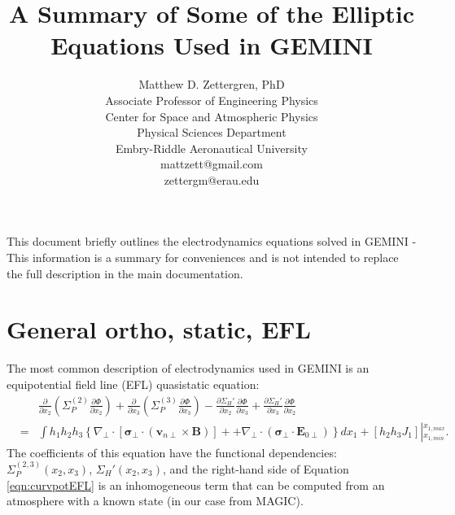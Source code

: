 \documentclass[11pt,letterpaper]{article}
\begin{document}
\setlength{\parindent}{0mm}
\setlength{\parskip}{0.4cm}




\title{A Summary of Some of the Elliptic Equations Used in GEMINI}
\author{Matthew D. Zettergren, PhD\\ Associate Professor of Engineering Physics\\ Center for Space and Atmospheric Physics\\ Physical Sciences Department \\Embry-Riddle Aeronautical University\\mattzett@gmail.com\\zettergm@erau.edu}
\maketitle

\tableofcontents

\pagebreak

This document briefly outlines the electrodynamics equations solved in GEMINI - This information is a summary for conveniences and is not intended to replace the full description in the main documentation.  

\section{General ortho, static, EFL} \label{sec:main}

The most common description of electrodynamics used in GEMINI is an equipotential field line (EFL) quasistatic equation:  
\begin{eqnarray}
&~& \frac{\partial}{\partial x_2} \left( \Sigma_P^{(2)} \frac{\partial \Phi}{\partial x_2} \right) + \frac{\partial}{\partial x_3} \left( \Sigma_P^{(3)} \frac{\partial \Phi}{\partial x_3} \right) -  \frac{\partial \Sigma_H'}{\partial x_2} \frac{\partial \Phi}{\partial x_3} + \frac{\partial \Sigma_H'}{\partial x_3} \frac{\partial \Phi}{\partial x_2} \nonumber \\ &=& \int h_1 h_2 h_3 \left\{ \nabla_\perp \cdot \left[ \boldsymbol{\sigma}_\perp \cdot \left( \mathbf{v}_{n\perp} \times \mathbf{B} \right) \right] + + \nabla_\perp \cdot \left( \boldsymbol{\sigma}_\perp \cdot \mathbf{E}_{0\perp} \right) \right\} d x_1 + \left[ h_2 h_3 J_1 \right] \left|^{x_{1,max}}_{x_{1,min}} \right. . \label{eqn:curvpotEFL}
\end{eqnarray}
The coefficients of this equation have the functional dependencies:  $\Sigma_P^{(2,3)}(x_2,x_3)$, $\Sigma_H'(x_2,x_3)$, and the right-hand side of Equation \ref{eqn:curvpotEFL} is an inhomogeneous term that can be computed from an atmosphere with a known state (in our case from MAGIC).  
\end{document}
